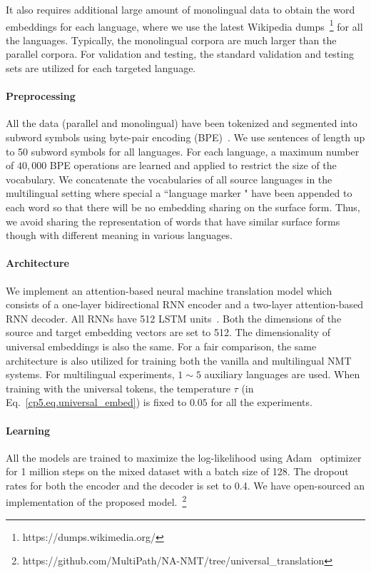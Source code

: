 It also requires additional large amount of monolingual data to obtain the word embeddings for each language, where we use the latest Wikipedia dumps~\footnote{https://dumps.wikimedia.org/} for all the languages. Typically, the monolingual corpora are much larger than the parallel corpora. For validation and testing, the standard validation and testing sets are utilized for each targeted language.

\paragraph{Preprocessing}
All the data (parallel and monolingual) have been tokenized and segmented into subword symbols using byte-pair encoding (BPE)~\cite{sennrich2015neural}. We use sentences of length up to 50 subword symbols for all languages.  For each language, a maximum number of $40,000$ BPE operations are  learned and  applied to restrict the size of the vocabulary.  We concatenate the vocabularies of all source languages in the multilingual setting where special a ``language marker " have been appended to each word  so that there will be no embedding sharing on the surface form. Thus, we avoid sharing the representation  of words that have similar surface forms though with different meaning in various languages.

\paragraph{Architecture} We implement an attention-based neural machine translation model which consists of a one-layer bidirectional RNN encoder and a two-layer attention-based RNN decoder. All  RNNs have 512 LSTM units~\cite{hochreiter1997long}. Both the dimensions of the source and target embedding vectors are set to 512. The dimensionality of universal embeddings is also the same. For a fair comparison, the same architecture is also utilized for training both the vanilla and multilingual NMT systems. For multilingual experiments, $1\sim 5$ auxiliary languages are used.  When training with the universal tokens, the temperature $\tau$ (in Eq.~\eqref{cp5.eq.universal_embed}) is fixed to $0.05$ for all the experiments.

\paragraph{Learning}
All the models are trained to maximize the log-likelihood using Adam~\cite{kingma2014adam} optimizer for 1 million steps on the mixed dataset with a batch size of 128. The dropout rates for both the encoder and the decoder is set to 0.4. %
We have open-sourced an implementation of the proposed model.~\footnote{https://github.com/MultiPath/NA-NMT/tree/universal\_translation}



